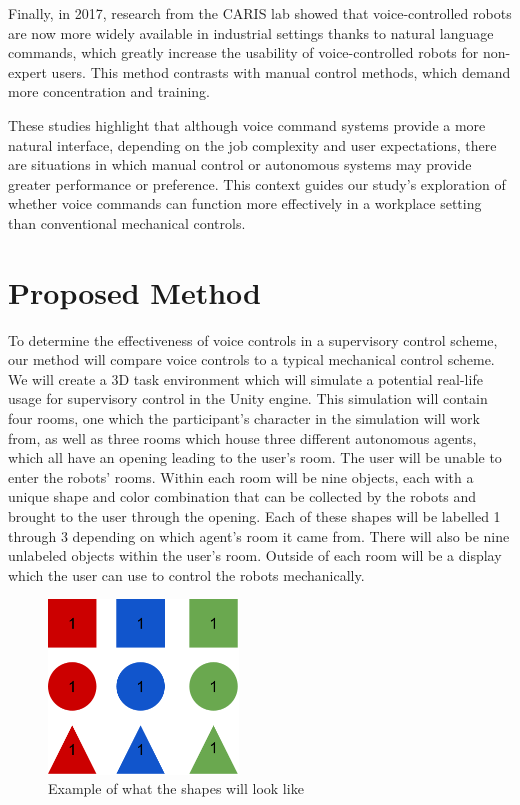 \documentclass[conference]{IEEEtran}
\begin{document}
Finally, in 2017, research from the CARIS lab \cite{evangelista2017grounding} showed that voice-controlled robots are now more widely available in industrial settings thanks to natural language commands, which greatly increase the usability of voice-controlled robots for non-expert users. This method contrasts with manual control methods, which demand more concentration and training.  

These studies highlight that although voice command systems provide a more natural interface, depending on the job complexity and user expectations, there are situations in which manual control or autonomous systems may provide greater performance or preference. This context guides our study's exploration of whether voice commands can function more effectively in a workplace setting than conventional mechanical controls. 

\section{Proposed Method}
To determine the effectiveness of voice controls in a supervisory control scheme, our method will compare voice controls to a typical mechanical control scheme. We will create a 3D task environment which will simulate a potential real-life usage for supervisory control in the Unity engine. This simulation will contain four rooms, one which the participant’s character in the simulation will work from, as well as three rooms which house three different autonomous agents, which all have an opening leading to the user’s room. The user will be unable to enter the robots’ rooms. Within each room will be nine objects, each with a unique shape and color combination that can be collected by the robots and brought to the user through the opening. Each of these shapes will be labelled 1 through 3 depending on which agent’s room it came from. There will also be nine unlabeled objects within the user’s room. Outside of each room will be a display which the user can use to control the robots mechanically.

\begin{figure}[htbp]
\centerline{\includegraphics[width=0.45\textwidth]{sample_shapes_grid.png}}
\caption{Example of what the shapes will look like}
\label{sample_grid}
\end{figure}
\end{document}
